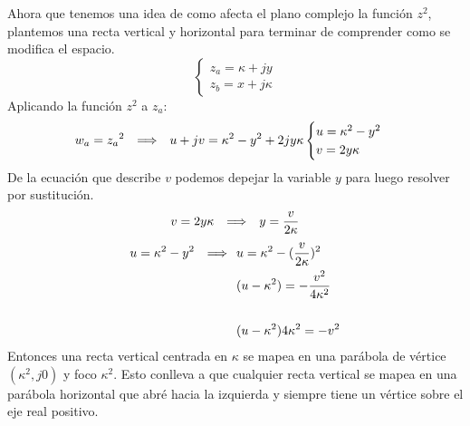 \begin{figure}[H]
    \centering
    \begin{minipage} {0.49\textwidth}
    \centering
        
    \end{minipage}
    \begin{minipage} {0.49\textwidth}
    \centering
        
    \end{minipage}
    \caption{}
    \label{fig:z^2F1}
\end{figure}

Ahora que tenemos una idea de como afecta el plano complejo la función $z^2$, plantemos una recta vertical y horizontal para terminar de comprender como se modifica el espacio.
\begin{equation}
    \begin{cases}
        z_a=\kappa+jy\\
        z_b=x+j\kappa
    \end{cases}
\end{equation}
Aplicando la función $z^2$ a $z_a$:
\begin{equation}
    w_a={z_a}^2\hspace{0.25cm} \Longrightarrow \hspace{0.25cm} u+jv=\kappa^2-y^2+2jy\kappa
    \begin{cases}
        u=\kappa^2-y^2\\
        v=2y\kappa
    \end{cases}
\end{equation}
De la ecuación que describe $v$ podemos depejar la variable $y$ para luego resolver por sustitución.
\begin{equation}
    v=2y\kappa\hspace{0.25cm} \Longrightarrow \hspace{0.25cm} y=\frac{v}{2\kappa}
\end{equation}
\begin{equation}
\begin{aligned}
     u=\kappa^2-y^2\hspace{0.25cm} \Longrightarrow \hspace{0.25cm} &u=\kappa^2-(\frac{v}{2\kappa})^2\\
                        &(u-\kappa^2)=-\frac{v^2}{4\kappa^2}\\
                        \\
                        &(u-\kappa^2)4\kappa^2=-v^2
\end{aligned}
\end{equation}
Entonces una recta vertical centrada en $\kappa$ se mapea en una parábola de vértice $(\kappa^2,j0)$ y foco $\kappa^2$. Esto conlleva a que cualquier recta vertical se mapea en una parábola horizontal que abré hacia la izquierda y siempre tiene un vértice sobre el eje real positivo.
\begin{figure}[H]
    \centering
    \begin{minipage}{0.49\textwidth}
    \centering
        
    \end{minipage}
    \begin{minipage}{0.49\textwidth}
    \centering
        
    \end{minipage}
    \caption{}
    \label{fig:Z^2VF}
\end{figure}
